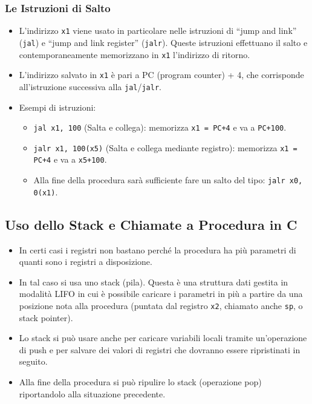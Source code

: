 \documentclass[12pt, a4paper]{article}
\begin{document}
\subsubsection{Le Istruzioni di Salto}
\begin{itemize}
    \item L'indirizzo \texttt{x1} viene usato in particolare nelle istruzioni di ``jump and link'' (\texttt{jal}) e ``jump and link register'' (\texttt{jalr}). Queste istruzioni effettuano il salto e contemporaneamente memorizzano in \texttt{x1} l'indirizzo di ritorno.
    \item L'indirizzo salvato in \texttt{x1} è pari a PC (program counter) + 4, che corrisponde all'istruzione successiva alla \texttt{jal}/\texttt{jalr}.
    \item Esempi di istruzioni:
    \begin{itemize}
        \item \texttt{jal x1, 100} (Salta e collega): memorizza \texttt{x1 = PC+4} e va a \texttt{PC+100}.
        \item \texttt{jalr x1, 100(x5)} (Salta e collega mediante registro): memorizza \texttt{x1 = PC+4} e va a \texttt{x5+100}.
        \item Alla fine della procedura sarà sufficiente fare un salto del tipo: \texttt{jalr x0, 0(x1)}.
    \end{itemize}
\end{itemize}

\subsection{Uso dello Stack e Chiamate a Procedura in C}
\begin{itemize}
    \item In certi casi i registri non bastano perché la procedura ha più parametri di quanti sono i registri a disposizione.
    \item In tal caso si usa uno stack (pila). Questa è una struttura dati gestita in modalità LIFO in cui è possibile caricare i parametri in più a partire da una posizione nota alla procedura (puntata dal registro \texttt{x2}, chiamato anche \texttt{sp}, o stack pointer).
    \item Lo stack si può usare anche per caricare variabili locali tramite un'operazione di push e per salvare dei valori di registri che dovranno essere ripristinati in seguito.
    \item Alla fine della procedura si può ripulire lo stack (operazione pop) riportandolo alla situazione precedente.
\end{itemize}
\end{document}
